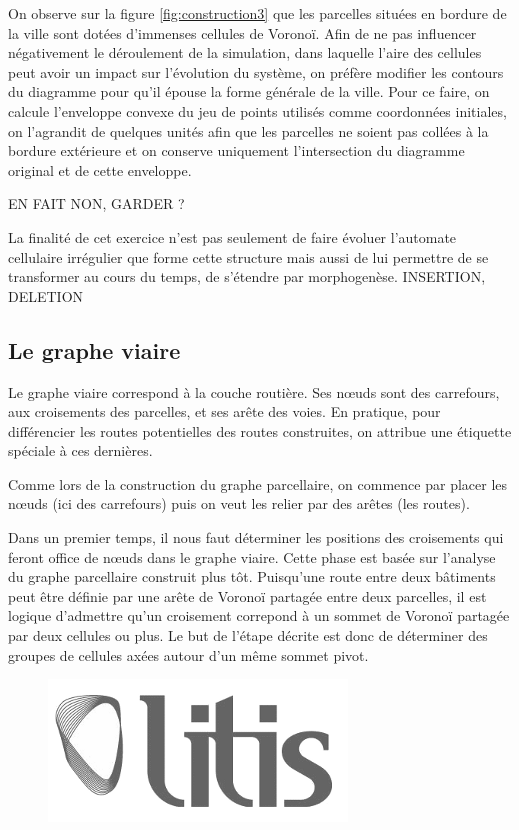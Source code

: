 \documentclass[12pt]{article}
\begin{document}
On observe sur la figure \ref{fig:construction3} que les parcelles
situées en bordure de la ville sont dotées d'immenses cellules de
Voronoï. Afin de ne pas influencer négativement le déroulement de la
simulation, dans laquelle l'aire des cellules peut avoir un impact sur
l'évolution du système, on préfère modifier les contours du diagramme
pour qu'il épouse la forme générale de la ville. Pour ce faire, on
calcule l'enveloppe convexe du jeu de points utilisés comme
coordonnées initiales, on l'agrandit de quelques unités afin que les
parcelles ne soient pas collées à la bordure extérieure et on conserve
uniquement l'intersection du diagramme original et de cette enveloppe.

EN FAIT NON, GARDER ?

La finalité de cet exercice n'est pas seulement de faire évoluer
l'automate cellulaire irrégulier que forme cette structure mais aussi
de lui permettre de se transformer au cours du temps, de s'étendre par
morphogenèse. INSERTION, DELETION

\subsection{Le graphe viaire}

Le graphe viaire correspond à la couche routière. Ses n\oe uds sont
des carrefours, aux croisements des parcelles, et ses arête des
voies. En pratique, pour différencier les routes potentielles des
routes construites, on attribue une étiquette spéciale à ces
dernières.

Comme lors de la construction du graphe parcellaire, on commence par
placer les n\oe uds (ici des carrefours) puis on veut les relier par
des arêtes (les routes).

Dans un premier temps, il nous faut déterminer les positions des
croisements qui feront office de n\oe uds dans le graphe viaire. Cette
phase est basée sur l'analyse du graphe parcellaire construit plus
tôt. Puisqu'une route entre deux bâtiments peut être définie par une
arête de Voronoï partagée entre deux parcelles, il est logique
d'admettre qu'un croisement correpond à un sommet de Voronoï partagée
par deux cellules ou plus. Le but de l'étape décrite est donc de
déterminer des groupes de cellules axées autour d'un même sommet
pivot.

\begin{figure}
  \centering
  \includegraphics[width=.6\linewidth]{images/logo-litis.png}
  \caption{}
  \label{fig:construction-viaire1}
\end{figure}
\end{document}
